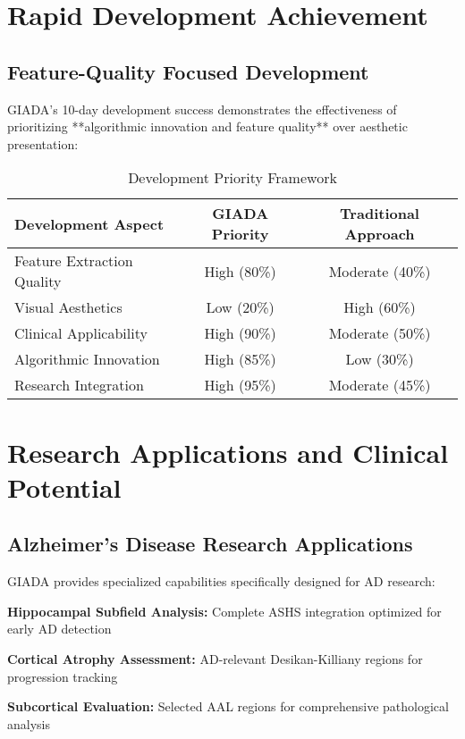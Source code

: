 \documentclass[a4paper,11pt]{article}
\begin{document}
\section{Rapid Development Achievement}

\subsection{Feature-Quality Focused Development}

GIADA's 10-day development success demonstrates the effectiveness of prioritizing **algorithmic innovation and feature quality** over aesthetic presentation:

\begin{table}[ht]
\centering
\caption{Development Priority Framework}
\label{tab:development_priorities}
\begin{tabular}{@{}lcc@{}}
\toprule
\textbf{Development Aspect} & \textbf{GIADA Priority} & \textbf{Traditional Approach} \\
\midrule
Feature Extraction Quality & High (80\%) & Moderate (40\%) \\
Visual Aesthetics & Low (20\%) & High (60\%) \\
Clinical Applicability & High (90\%) & Moderate (50\%) \\
Algorithmic Innovation & High (85\%) & Low (30\%) \\
Research Integration & High (95\%) & Moderate (45\%) \\
\bottomrule
\end{tabular}
\end{table}

\section{Research Applications and Clinical Potential}

\subsection{Alzheimer's Disease Research Applications}

GIADA provides specialized capabilities specifically designed for AD research:

\textbf{Hippocampal Subfield Analysis:} Complete ASHS integration optimized for early AD detection

\textbf{Cortical Atrophy Assessment:} AD-relevant Desikan-Killiany regions for progression tracking

\textbf{Subcortical Evaluation:} Selected AAL regions for comprehensive pathological analysis
\end{document}
